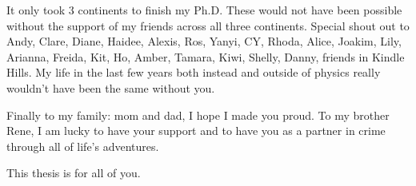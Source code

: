 It only took 3 continents to finish my Ph.D. These would not have been possible without the support of my friends across all three continents. Special shout out to Andy, Clare, Diane, Haidee, Alexis, Ros, Yanyi, CY, Rhoda, Alice, Joakim, Lily, Arianna, Freida, Kit, Ho, Amber, Tamara, Kiwi, Shelly, Danny, friends in Kindle Hills. My life in the last few years both instead and outside of physics really wouldn't have been the same without you.

Finally to my family: mom and dad, I hope I made you proud. To my brother Rene, I am lucky to have your support and to have you as a partner in crime through all of life's adventures.

This thesis is for all of you.

